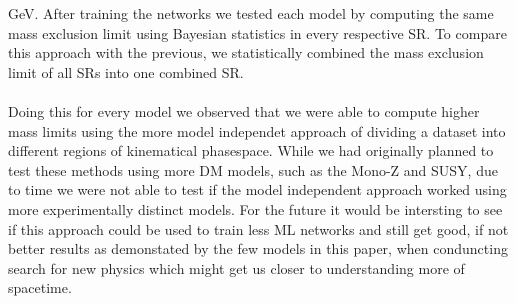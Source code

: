 \documentclass[12pt, a4paper]{book}
\begin{document}
GeV. After training the networks we tested each model by computing the same mass exclusion limit using Bayesian statistics in every respective SR. To compare this approach with the previous, we statistically combined the mass exclusion limit of all SRs into 
one combined SR. \\
\\Doing this for every model we observed that we were able to compute higher mass limits using the more model independet approach of dividing a dataset into different regions of kinematical phasespace. While we had originally planned to test these methods 
using more DM models, such as the Mono-Z and SUSY, due to time we were not able to test if the model independent approach worked using more experimentally distinct models. For the future it would be intersting to see if this approach could be used to train 
less ML networks and still get good, if not better results as demonstated by the few models in this paper, when conduncting search for new physics which might get us closer to understanding more of spacetime.
\end{document}

